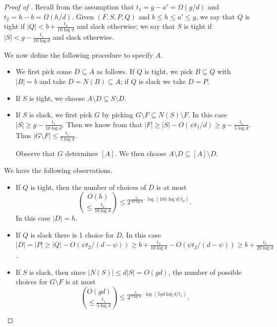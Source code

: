 \documentclass{amsart}
\theoremstyle{definition}
\newcommand{\0}[0]{\emptyset}
\begin{document}
\begin{proof}[Proof of ]
    Recall from the assumption that $t_1=g-a'=\Omega(g/d)$ and $t_2=h-b=\Omega(h/d)$. Given $(F,S,P,Q)$ and $b\leq h\leq a'\leq g$, we say that $Q$ is tight if $|Q|<b+\frac{t_2}{10\log d}$ and slack otherwise; we say that $S$ is tight if $|S|<g- \frac{t_1}{10\log d}$ and slack otherwise.

    We now define the following procedure to specify $A$. 
    \begin{itemize}
        \item We first pick some $D\subseteq A$ as follows. If $Q$ is tight, we pick $B\subseteq Q$ with $|B|=b$ and take $D= N(B)\subseteq A$; if $Q$ is slack we take $D=P$.
        \item If $S$ is tight, we choose $A\setminus D \subseteq S\setminus D$.
        \item If $S$ is slack, we first pick $G$ by picking $G\setminus F\subseteq N(S)\setminus F$. In this case $|S|\geq g-\frac{t_1}{10\log d}$. Then we know from  that $|F|\geq |S|-O(\psi t_1/d)\geq g-\frac{t_1}{5\log d}$. Thus $|G\setminus F|\leq \frac{t_1}{5\log d}$.
        
        Observe that $G$ determines $[A]$. We then choose $A\setminus D\subseteq [A]\setminus D$.
    \end{itemize}

    We have the following observations.
    \begin{itemize}
        \item If $Q$ is tight, then the number of choices of $D$ is at most 
        \[
        \binom{O(h)}{\leq \frac{t_2}{10\log d}}\leq 2^{\frac{t_2}{10\log d}\cdot \log(10h\log d/t_2)}.
        \]
        In this case $|D|=h$.
        \item If $Q$ is slack there is 1 choice for $D$. In this case $|D|=|P|\geq |Q|-O(\psi t_2/(d-\psi))\geq b+ \frac{t_2}{10\log d}-O(\psi t_2/(d-\psi))\geq b+ \frac{t_2}{20\log d}$.
        \item If $S$ is slack, then since $|N(S)|\leq d|S|=O(gd)$, the number of possible choices for $G\setminus F$ is at most
        \[
        \binom{O(gd)}{\leq \frac{t_1}{5\log d}}\leq 2^{ \frac{t_1}{5\log d}\cdot \log(5gd\log d/t_1)}.
        \]
    \end{itemize}


\end{proof}
\end{document}
